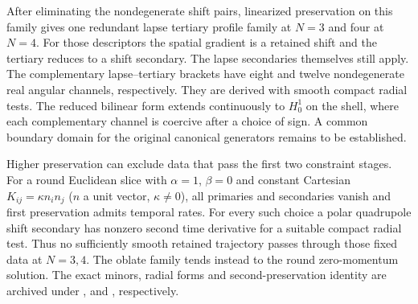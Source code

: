 After eliminating the nondegenerate shift pairs, linearized preservation on this family gives one redundant lapse tertiary profile family at $N=3$ and four at $N=4$. For those descriptors the spatial gradient is a retained shift and the tertiary reduces to a shift secondary. The lapse secondaries themselves still apply. The complementary lapse--tertiary brackets have eight and twelve nondegenerate real angular channels, respectively. They are derived with smooth compact radial tests. The reduced bilinear form extends continuously to $H^1_0$ on the shell, where each complementary channel is coercive after a choice of sign. A common boundary domain for the original canonical generators remains to be established.

Higher preservation can exclude data that pass the first two constraint stages. For a round Euclidean slice with $\alpha=1$, $\beta=0$ and constant Cartesian $K_{ij}=\kappa n_i n_j$ ($n$ a unit vector, $\kappa\ne0$), all primaries and secondaries vanish and first preservation admits temporal rates. For every such choice a polar quadrupole shift secondary has nonzero second time derivative for a suitable compact radial test. Thus no sufficiently smooth retained trajectory passes through those fixed data at $N=3,4$. The oblate family tends instead to the round zero-momentum solution. The exact minors, radial forms and second-preservation identity are archived under ,  and , respectively.
